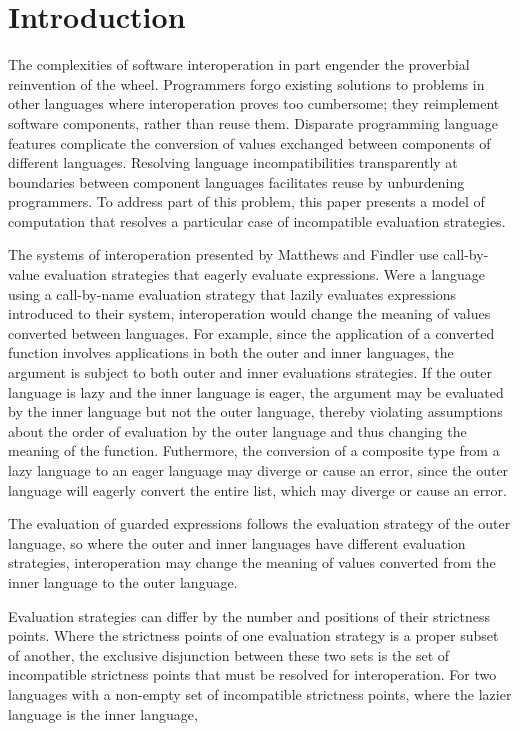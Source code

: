 \section{Introduction}

The complexities of software interoperation in part engender the proverbial reinvention of the wheel. Programmers forgo existing solutions to problems in other languages where interoperation proves too cumbersome; they reimplement software components, rather than reuse them. Disparate programming language features complicate the conversion of values exchanged between components of different languages. Resolving language incompatibilities transparently at boundaries between component languages facilitates reuse by unburdening programmers. To address part of this problem, this paper presents a model of computation that resolves a particular case of incompatible evaluation strategies.

The systems of interoperation presented by Matthews and Findler \cite{matthews07} use call-by-value evaluation strategies that eagerly evaluate expressions. Were a language using a call-by-name evaluation strategy that lazily evaluates expressions introduced to their system, interoperation would change the meaning of values converted between languages. For example, since the application of a converted function involves applications in both the outer and inner languages, the argument is subject to both outer and inner evaluations strategies. If the outer language is lazy and the inner language is eager, the argument may be evaluated by the inner language but not the outer language, thereby violating assumptions about the order of evaluation by the outer language and thus changing the meaning of the function. Futhermore, the conversion of a composite type from a lazy language to an eager language may diverge or cause an error, since the outer language will eagerly convert the entire list, which may diverge or cause an error.

The evaluation of guarded expressions follows the evaluation strategy of the outer language, so where the outer and inner languages have different evaluation strategies, interoperation may change the meaning of values converted from the inner language to the outer language.

Evaluation strategies can differ by the number and positions of their strictness points. Where the strictness points of one evaluation strategy is a proper subset of another, the exclusive disjunction between these two sets is the set of incompatible strictness points that must be resolved for interoperation. For two languages with a non-empty set of incompatible strictness points, where the lazier language is the inner language, 

